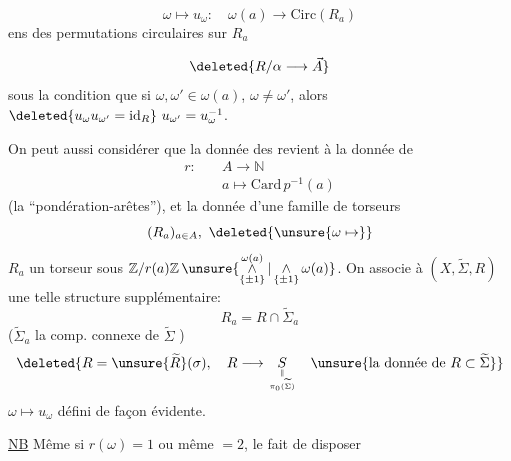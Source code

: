 
\[
\omega\longmapsto u_\omega:\quad\omega(a)\longrightarrow\mathrm{Circ}(R_a)
\]
ens des permutations circulaires sur $R_a$

\[
\deleted{R/\alpha\longrightarrow\vec A}
\]
sous la condition que si $\omega,\omega'\in\omega(a)$, $\omega\ne\omega'$, alors $\deleted{u_\omega u_{\omega'}=\mathrm{id}_R}\ u_{\omega'}=u_\omega^{-1}$.

On peut aussi considérer que la donnée des  revient à la donnée de
\[
\begin{aligned}
r:&\quad A\longrightarrow\mathbb N\\
&\quad a\longmapsto\mathrm{Card}\,p^{-1}(a)
\end{aligned}
\]
(la ``pondération-arêtes''), et la donnée d'une famille de torseurs
\[
(R_a)_{a\in A},\ \deleted{\unsure{\omega\mapsto}}
\]
$R_a$ un torseur sous $\mathbb Z/r(a)\mathbb Z\,\unsure{\mathop{\wedge}\limits_{\{\pm1\}}^{\omega(a)}|\mathop{\wedge}\limits_{\{\pm1\}}\omega(a)}$. On associe à $(X,\widetilde\Sigma,R)$ une telle structure supplémentaire:
\[
R_a=R\cap\widetilde\Sigma_a
\]
($\widetilde\Sigma_a$ la comp. connexe de $\widetilde\Sigma$ )
\[
\deleted{R=\unsure{\widetilde R}(\sigma),\quad R\longrightarrow\underset{\Vert\atop\pi_0(\widetilde\Sigma)}{S}\quad\unsure{\text{la donnée de }R\subset\widetilde\Sigma}}
\]
$\omega\mapsto u_\omega$ défini de façon évidente.


\uline{NB} Même si $r(\omega)=1$ ou même $=2$, le fait de disposer


